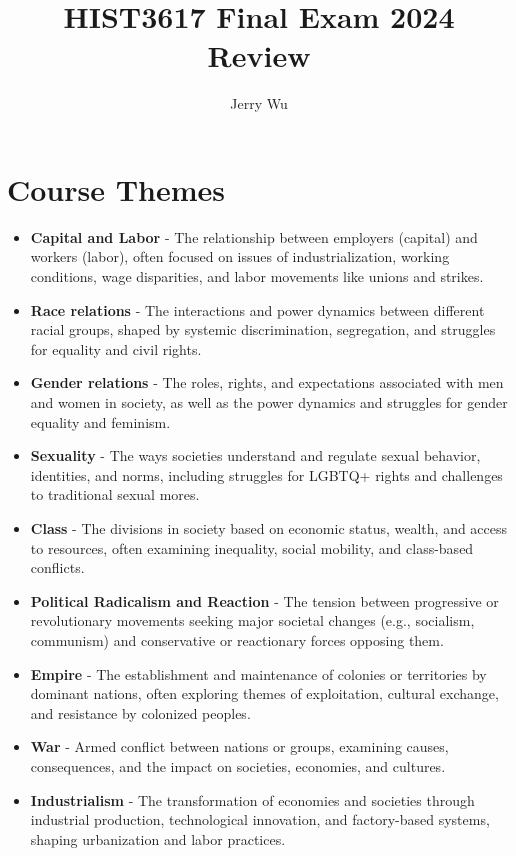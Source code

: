 \documentclass[12pt]{article}
\title{HIST3617 Final Exam 2024 Review}
\author{Jerry Wu}
\begin{document}
\maketitle

\section*{Course Themes}
\begin{itemize}
    \item{\textbf{Capital and Labor}} - The relationship between employers (capital) and workers (labor), often focused on issues of industrialization, working conditions, wage disparities, and labor movements like unions and strikes.
    \item{\textbf{Race relations}} - The interactions and power dynamics between different racial groups, shaped by systemic discrimination, segregation, and struggles for equality and civil rights.
    \item{\textbf{Gender relations}} - The roles, rights, and expectations associated with men and women in society, as well as the power dynamics and struggles for gender equality and feminism.
    \item{\textbf{Sexuality}} - The ways societies understand and regulate sexual behavior, identities, and norms, including struggles for LGBTQ+ rights and challenges to traditional sexual mores.
    \item{\textbf{Class}} - The divisions in society based on economic status, wealth, and access to resources, often examining inequality, social mobility, and class-based conflicts.
    \item{\textbf{Political Radicalism and Reaction}} - The tension between progressive or revolutionary movements seeking major societal changes (e.g., socialism, communism) and conservative or reactionary forces opposing them.
    \item{\textbf{Empire}} - The establishment and maintenance of colonies or territories by dominant nations, often exploring themes of exploitation, cultural exchange, and resistance by colonized peoples.
    \item{\textbf{War}} - Armed conflict between nations or groups, examining causes, consequences, and the impact on societies, economies, and cultures.
    \item{\textbf{Industrialism}} - The transformation of economies and societies through industrial production, technological innovation, and factory-based systems, shaping urbanization and labor practices.

\end{itemize}
\end{document}
